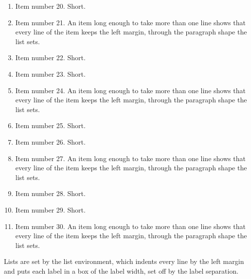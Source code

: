 \documentclass[11pt]{article}
\begin{document}
\begin{enumerate}
\item Item number 20. Short.
\item Item number 21. An item long enough to take more than one line shows that every line of the item keeps the left margin, through the paragraph shape the list sets.
\item Item number 22. Short.
\item Item number 23. Short.
\item Item number 24. An item long enough to take more than one line shows that every line of the item keeps the left margin, through the paragraph shape the list sets.
\item Item number 25. Short.
\item Item number 26. Short.
\item Item number 27. An item long enough to take more than one line shows that every line of the item keeps the left margin, through the paragraph shape the list sets.
\item Item number 28. Short.
\item Item number 29. Short.
\item Item number 30. An item long enough to take more than one line shows that every line of the item keeps the left margin, through the paragraph shape the list sets.
\end{enumerate}

Lists are set by the list environment, which indents every line by the left margin and puts each label in a box of the label width, set off by the label separation.
\end{document}
